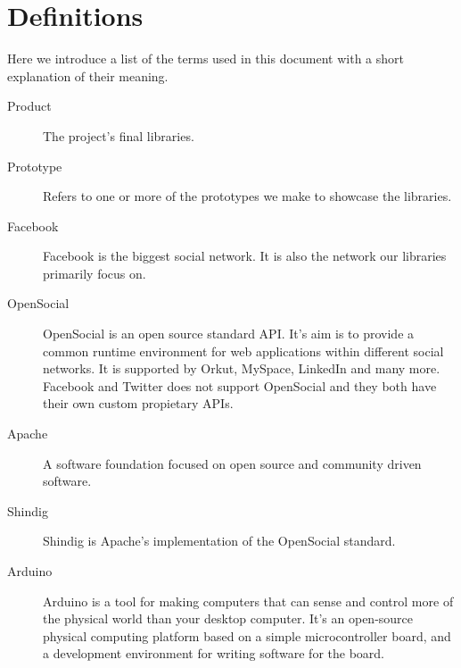\section{Definitions}

Here we introduce a list of the terms used in this document with a short explanation of their meaning.

\begin{description}
\item[Product] The project's final libraries. 
\item[Prototype] Refers to one or more of the prototypes we make to showcase the libraries.
\item[Facebook] Facebook is the biggest social network. It is also the network our libraries primarily focus on.
\item[OpenSocial] OpenSocial is an open source standard API. It's aim is to provide a common runtime environment for web applications within different social networks.
It is supported by Orkut, MySpace, LinkedIn and many more. Facebook and Twitter does not support
OpenSocial and they both have their own custom propietary APIs.
\item[Apache] A software foundation focused on open source and community driven software.
\item[Shindig] Shindig is Apache's implementation of the OpenSocial standard.
\item[Arduino] Arduino is a tool for making computers that can sense and control more of the physical world than your desktop computer. It's an open-source physical computing platform based on a simple microcontroller board, and a development environment for writing software for the board. \cite{link:arduino}
\end{description}
